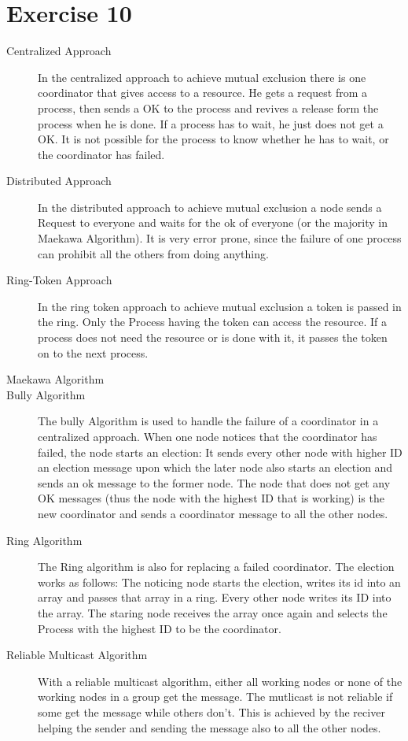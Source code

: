 \documentclass{article}
\begin{document}
	\section*{Exercise 10}
	\begin{description}
		\item[Centralized Approach] In the centralized approach to achieve mutual exclusion there is one coordinator that gives access to a resource. He gets a request from a process, then sends a OK to the process and revives a release form the process when he is done. If a process has to wait, he just does not get a OK. It is not possible for the process to know whether he has to wait, or the coordinator has failed. 
		
		\item[Distributed Approach] In the distributed approach to achieve mutual exclusion a node sends a Request to everyone and waits for the ok of everyone (or the majority in Maekawa Algorithm). It is very error prone, since the failure of one process can prohibit all the others from doing anything. 
		
		\item[Ring-Token Approach] In the ring token approach to achieve mutual exclusion a token is passed in the ring. Only the Process having the token can access the resource. If a process does not need the resource or is done with it, it passes the token on to the next process. 
		
		\item[Maekawa Algorithm]
		
		\item[Bully Algorithm] The bully Algorithm is used to handle the failure of a coordinator in a centralized approach. When one node notices that the coordinator has failed, the node starts an election: It sends every other node with higher ID an election message upon which the later node also starts an election and sends an ok message to the former node. The node that does not get any OK messages (thus the node with the highest ID that is working) is the new coordinator and sends a coordinator message to all the other nodes. 
		
		\item[Ring Algorithm] The Ring algorithm is also for replacing a failed coordinator. The election works as follows: The noticing node starts the election, writes its id into an array and passes that array in a ring. Every other node writes its ID into the array. The staring node receives the array once again and selects the Process with the highest ID to be the coordinator. 
		
		\item[Reliable Multicast Algorithm] With a reliable multicast algorithm, either all working nodes or none of the working nodes in a group get the message. The mutlicast is not reliable if some get the message while others don't. This is achieved by the reciver helping the sender and sending the message also to all the other nodes. 
	\end{description}
 
\end{document}
